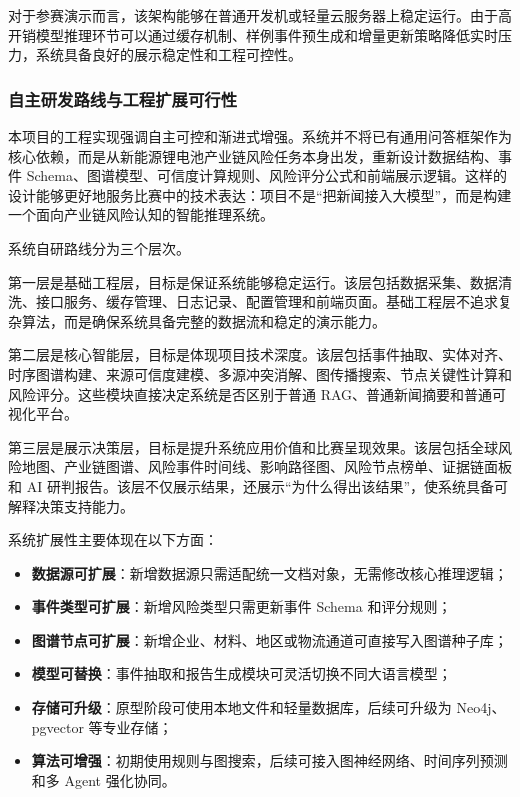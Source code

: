 ﻿\documentclass[12pt,a4paper]{article}
\newcommand{\term}[1]{\textbf{#1}}
\begin{document}
对于参赛演示而言，该架构能够在普通开发机或轻量云服务器上稳定运行。由于高开销模型推理环节可以通过缓存机制、样例事件预生成和增量更新策略降低实时压力，系统具备良好的展示稳定性和工程可控性。

\subsubsection{自主研发路线与工程扩展可行性}

本项目的工程实现强调自主可控和渐进式增强。系统并不将已有通用问答框架作为核心依赖，而是从新能源锂电池产业链风险任务本身出发，重新设计数据结构、事件 Schema、图谱模型、可信度计算规则、风险评分公式和前端展示逻辑。这样的设计能够更好地服务比赛中的技术表达：项目不是“把新闻接入大模型”，而是构建一个面向产业链风险认知的智能推理系统。

系统自研路线分为三个层次。

第一层是基础工程层，目标是保证系统能够稳定运行。该层包括数据采集、数据清洗、接口服务、缓存管理、日志记录、配置管理和前端页面。基础工程层不追求复杂算法，而是确保系统具备完整的数据流和稳定的演示能力。

第二层是核心智能层，目标是体现项目技术深度。该层包括事件抽取、实体对齐、时序图谱构建、来源可信度建模、多源冲突消解、图传播搜索、节点关键性计算和风险评分。这些模块直接决定系统是否区别于普通 RAG、普通新闻摘要和普通可视化平台。

第三层是展示决策层，目标是提升系统应用价值和比赛呈现效果。该层包括全球风险地图、产业链图谱、风险事件时间线、影响路径图、风险节点榜单、证据链面板和 AI 研判报告。该层不仅展示结果，还展示“为什么得出该结果”，使系统具备可解释决策支持能力。

系统扩展性主要体现在以下方面：
\begin{itemize}
    \item \term{数据源可扩展}：新增数据源只需适配统一文档对象，无需修改核心推理逻辑；
    \item \term{事件类型可扩展}：新增风险类型只需更新事件 Schema 和评分规则；
    \item \term{图谱节点可扩展}：新增企业、材料、地区或物流通道可直接写入图谱种子库；
    \item \term{模型可替换}：事件抽取和报告生成模块可灵活切换不同大语言模型；
    \item \term{存储可升级}：原型阶段可使用本地文件和轻量数据库，后续可升级为 Neo4j、pgvector 等专业存储；
    \item \term{算法可增强}：初期使用规则与图搜索，后续可接入图神经网络、时间序列预测和多 Agent 强化协同。
\end{itemize}
\end{document}
